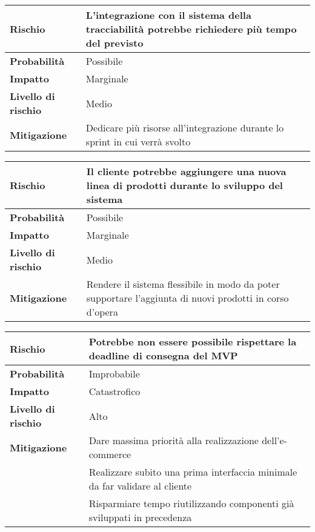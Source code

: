 \begin{table}[H]
  \begin{tabularx}{\textwidth}{lX}
    \toprule
    \textbf{Rischio} & \textbf{L'integrazione con il sistema della tracciabilità potrebbe richiedere più tempo del previsto} \\
    \midrule
    \textbf{Probabilità} & Possibile \\
    \textbf{Impatto} & Marginale \\
    \textbf{Livello di rischio} & Medio \\
    \textbf{Mitigazione} & Dedicare più risorse all'integrazione durante lo sprint in cui verrà svolto \\
    \bottomrule
  \end{tabularx}
\end{table}

\begin{table}[H]
  \begin{tabularx}{\textwidth}{lX}
    \toprule
    \textbf{Rischio} & \textbf{Il cliente potrebbe aggiungere una nuova linea di prodotti durante lo sviluppo del sistema} \\
    \midrule
    \textbf{Probabilità} & Possibile \\
    \textbf{Impatto} & Marginale \\
    \textbf{Livello di rischio} & Medio \\
    \textbf{Mitigazione} & Rendere il sistema flessibile in modo da poter supportare l'aggiunta di nuovi prodotti in corso d'opera \\
    \bottomrule
  \end{tabularx}
\end{table}

\begin{table}[H]
  \begin{tabularx}{\textwidth}{lX}
    \toprule
    \textbf{Rischio} & \textbf{Potrebbe non essere possibile rispettare la deadline di consegna del MVP} \\
    \midrule
    \textbf{Probabilità} & Improbabile \\
    \textbf{Impatto} & Catastrofico \\
    \textbf{Livello di rischio} & Alto \\
    \textbf{Mitigazione} & Dare massima priorità alla realizzazione dell'e-commerce \\
    & Realizzare subito una prima interfaccia minimale da far validare al cliente \\
    & Risparmiare tempo riutilizzando componenti già sviluppati in precedenza \\
    \bottomrule
  \end{tabularx}
\end{table}

